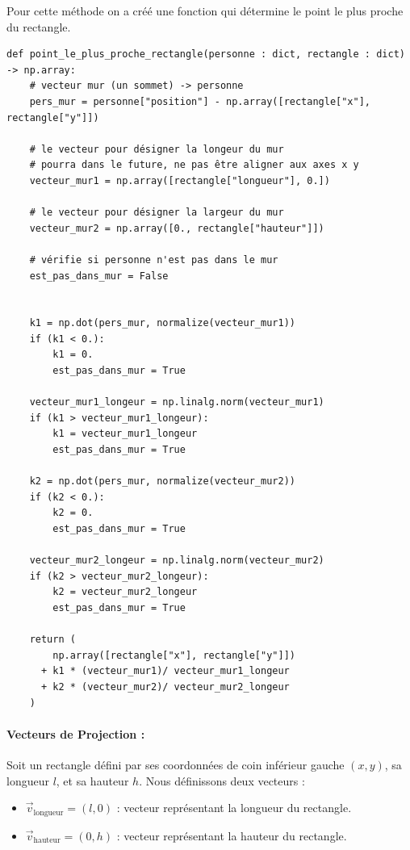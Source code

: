 \documentclass[a4paper,12pt]{article}
\begin{document}
Pour cette méthode on a créé une fonction qui détermine le point le plus proche du rectangle.


\begin{verbatim}
def point_le_plus_proche_rectangle(personne : dict, rectangle : dict) -> np.array:
    # vecteur mur (un sommet) -> personne
    pers_mur = personne["position"] - np.array([rectangle["x"], rectangle["y"]])
    
    # le vecteur pour désigner la longeur du mur 
    # pourra dans le future, ne pas être aligner aux axes x y
    vecteur_mur1 = np.array([rectangle["longueur"], 0.])
    
    # le vecteur pour désigner la largeur du mur 
    vecteur_mur2 = np.array([0., rectangle["hauteur"]])
    
    # vérifie si personne n'est pas dans le mur
    est_pas_dans_mur = False
    
    
    k1 = np.dot(pers_mur, normalize(vecteur_mur1))
    if (k1 < 0.):
        k1 = 0.
        est_pas_dans_mur = True
    
    vecteur_mur1_longeur = np.linalg.norm(vecteur_mur1)
    if (k1 > vecteur_mur1_longeur):
        k1 = vecteur_mur1_longeur
        est_pas_dans_mur = True
    
    k2 = np.dot(pers_mur, normalize(vecteur_mur2))
    if (k2 < 0.):
        k2 = 0.
        est_pas_dans_mur = True
    
    vecteur_mur2_longeur = np.linalg.norm(vecteur_mur2)
    if (k2 > vecteur_mur2_longeur):
        k2 = vecteur_mur2_longeur
        est_pas_dans_mur = True
        
    return (
        np.array([rectangle["x"], rectangle["y"]])
      + k1 * (vecteur_mur1)/ vecteur_mur1_longeur
      + k2 * (vecteur_mur2)/ vecteur_mur2_longeur
    )

\end{verbatim}

\paragraph{Vecteurs de Projection :}

Soit un rectangle défini par ses coordonnées de coin inférieur gauche $(x, y)$, sa longueur $l$, et sa hauteur $h$. Nous définissons deux vecteurs :
\begin{itemize}
    \item $\vec{v}_{\text{longueur}} = (l, 0)$ : vecteur représentant la longueur du rectangle.
    \item $\vec{v}_{\text{hauteur}} = (0, h)$ : vecteur représentant la hauteur du rectangle.
\end{itemize}
\end{document}
